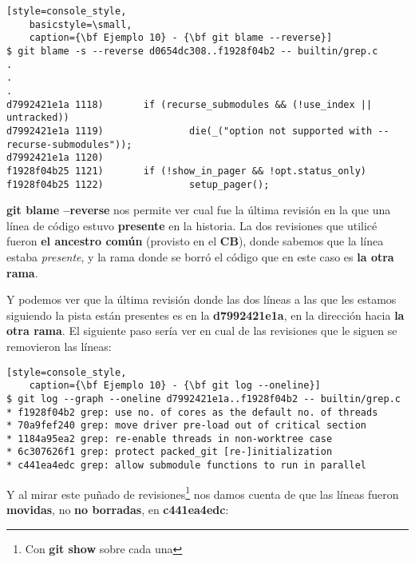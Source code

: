 \begin{lstlisting}[style=console_style,
	basicstyle=\small,
	caption={\bf Ejemplo 10} - {\bf git blame --reverse}]
$ git blame -s --reverse d0654dc308..f1928f04b2 -- builtin/grep.c
.
.
.
d7992421e1a 1118)       if (recurse_submodules && (!use_index || untracked))
d7992421e1a 1119)               die(_("option not supported with --recurse-submodules"));
d7992421e1a 1120) 
f1928f04b25 1121)       if (!show_in_pager && !opt.status_only)
f1928f04b25 1122)               setup_pager();
\end{lstlisting}
{\bf git blame --reverse} nos permite ver cual fue la última revisión en la que una línea de código estuvo {\bf presente} en la
historia. La dos revisiones que utilicé fueron {\bf el ancestro común} (provisto en el {\bf CB}), donde sabemos que la línea
estaba {\it presente}, y la rama donde se borró el código que en este caso es {\bf la otra rama}.

Y podemos ver que la última revisión donde las dos líneas a las que les estamos siguiendo la pista están presentes es en 
la {\bf d7992421e1a}, en la dirección hacia {\bf la otra rama}. El siguiente paso sería ver en cual de las revisiones que
le siguen se removieron las líneas:

\begin{lstlisting}[style=console_style,
	caption={\bf Ejemplo 10} - {\bf git log --oneline}]
$ git log --graph --oneline d7992421e1a..f1928f04b2 -- builtin/grep.c
* f1928f04b2 grep: use no. of cores as the default no. of threads
* 70a9fef240 grep: move driver pre-load out of critical section
* 1184a95ea2 grep: re-enable threads in non-worktree case
* 6c307626f1 grep: protect packed_git [re-]initialization
* c441ea4edc grep: allow submodule functions to run in parallel
\end{lstlisting}

Y al mirar este puñado de revisiones\footnote{Con {\bf git show} sobre cada una} nos damos cuenta de que las líneas
fueron {\bf movidas}, no {\bf no borradas}, en {\bf c441ea4edc}:

